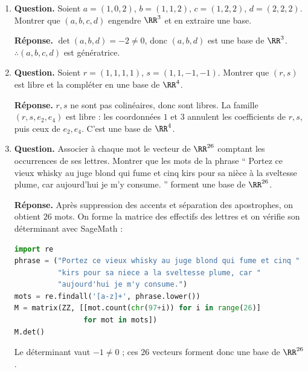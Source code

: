 \documentclass[12pt, a4paper]{article}
\begin{document}
\begin{enumerate}[label=6.\arabic*., start=105]
  \item \begin{minipage}[t]{\linewidth}\raggedright
\textbf{Question.} Soient $a=(1,0,2)$, $b=(1,1,2)$, $c=(1,2,2)$, $d=(2,2,2)$. Montrer que $(a,b,c,d)$ engendre $\RR^3$ et en extraire une base.
\par\smallskip
\textbf{Réponse.} $\det(a,b,d)=-2\neq0$, donc $(a,b,d)$ est une base de $\RR^3$.
    $\therefore(a,b,c,d)$ est génératrice.
\end{minipage}

  \item \begin{minipage}[t]{\linewidth}\raggedright
\textbf{Question.} Soient $r=(1,1,1,1)$, $s=(1,1,-1,-1)$. Montrer que $(r,s)$ est libre et la compléter en une base de $\RR^4$.
\par\smallskip
\textbf{Réponse.} $r,s$ ne sont pas colinéaires, donc sont libres.
    La famille $(r,s,e_2,e_4)$ est libre : les coordonnées $1$ et $3$ annulent les coefficients de $r,s$, puis ceux de $e_2,e_4$.
    C'est une base de $\RR^4$.
\end{minipage}

  \item \begin{minipage}[t]{\linewidth}\raggedright
\textbf{Question.} Associer à chaque mot le vecteur de $\RR^{26}$ comptant les occurrences de ses lettres. Montrer que les mots de la phrase `` Portez ce vieux whisky au juge blond qui fume et cinq kirs pour sa nièce à la sveltesse plume, car aujourd’hui je m’y consume. '' forment une base de $\RR^{26}$.
\par\smallskip
\textbf{Réponse.} Après suppression des accents et séparation des apostrophes, on obtient $26$ mots.
    On forme la matrice des effectifs des lettres et on vérifie son déterminant avec SageMath :
\begin{lstlisting}[style=mystyle,language=Python]
import re
phrase = ("Portez ce vieux whisky au juge blond qui fume et cinq "
          "kirs pour sa niece a la sveltesse plume, car "
          "aujourd'hui je m'y consume.")
mots = re.findall('[a-z]+', phrase.lower())
M = matrix(ZZ, [[mot.count(chr(97+i)) for i in range(26)]
                for mot in mots])
M.det()
\end{lstlisting}
    Le déterminant vaut $-1\neq0$ ; ces $26$ vecteurs forment donc une base de $\RR^{26}$.
\end{minipage}


\end{enumerate}
\end{document}
